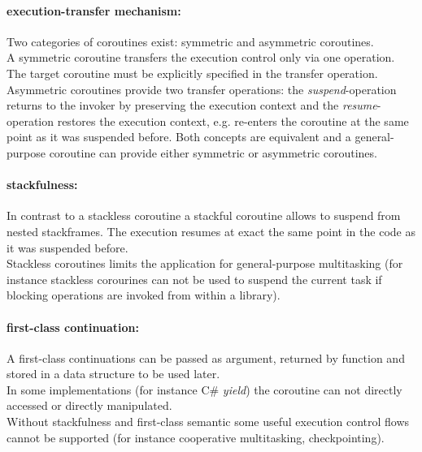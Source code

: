 \paragraph*{execution-transfer mechanism:}
Two categories of coroutines exist: symmetric and asymmetric coroutines.\\
\newline
A symmetric coroutine transfers the execution control only via one operation.
The target coroutine must be explicitly specified in the transfer operation.\\
\newline
Asymmetric coroutines provide two transfer operations:
the \textit{suspend}-operation returns to the invoker by preserving the
execution context  and the \textit{resume}-operation restores the execution
context, e.g. re-enters the coroutine at the same point as it was suspended
before.
Both concepts are equivalent and a general-purpose coroutine can provide either
symmetric or asymmetric coroutines\cite{Moura2009}.

\paragraph*{stackfulness:}
In contrast to a stackless coroutine a stackful coroutine allows to suspend
from nested stackframes. The execution resumes at exact the same point in the
code as it was suspended before.\\
Stackless coroutines limits the application for general-purpose multitasking
\cite{Moura2009} (for instance stackless corourines can not be used to suspend
the current task if blocking operations are invoked from within a library).

\paragraph*{first-class continuation:}
A first-class continuations can be passed as argument, returned by
function and stored in a data structure to be used later.\\
In some implementations (for instance C# \textit{yield}) the coroutine can not
directly accessed or directly manipulated.\\
\newline
Without stackfulness and first-class semantic some useful execution control
flows cannot be supported (for instance cooperative multitasking,
checkpointing).
